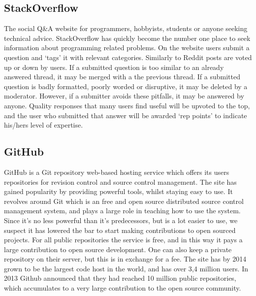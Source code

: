 \documentclass[a4paper,11pt]{article} %
\begin{document}
\subsection{StackOverflow}

The social Q\&A website for programmers, hobbyists, students or anyone
seeking technical advice. StackOverflow has quickly become the number one
place to seek information about programming related problems. On the
website users submit a question and ‘tags’ it with relevant categories.
Similarly to Reddit posts are voted up or down by users. If a
submitted question is too similar to an already answered thread, it may be
merged with a the previous thread. If a submitted question is badly formatted,
poorly worded or disruptive, it may be deleted by a moderator.
However, if a submitter avoids these pitfalls, it may be answered by
anyone. Quality responses that many users find useful will be upvoted to the
top, and the user who submitted that answer will be awarded ‘rep points’ to
indicate his/hers level of expertise. 


\subsection{GitHub}

GitHub is a Git repository web-based 
hosting service which offers its users
repositories for revision control and source control management. The site
has gained popularity by providing powerful tools, whilst staying easy to
use. It revolves around Git which is an free and open source distributed
source control management system, and plays a large role in teaching how to
use the system. Since it’s no less powerful than it’s predecessors, but is a
lot easier to use, we suspect it has lowered the bar to start making
contributions to open sourced projects. For all public repositories the
service is free, and in this way it pays a large contribution to open source
development. One can also keep a private repository on their server, but
this is in exchange for a fee. The site has by 2014 grown to be the largest
code host in the world, and has over 3,4 million users. In 2013 Github
announced that they had reached 10 million public repositories, which
accumulates to a very large contribution to the open source community.
\end{document}

